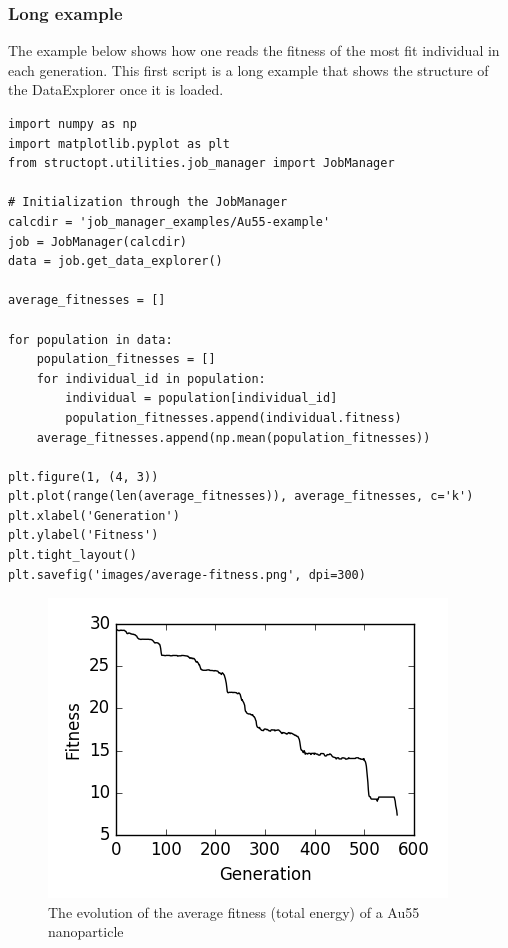 \documentclass[11pt]{article}
\begin{document}
\subsubsection{Long example}
\label{sec:orgheadline3}
The example below shows how one reads the fitness of the most fit individual in each generation. This first script is a long example that shows the structure of the DataExplorer once it is loaded. 

\begin{verbatim}
import numpy as np
import matplotlib.pyplot as plt
from structopt.utilities.job_manager import JobManager

# Initialization through the JobManager
calcdir = 'job_manager_examples/Au55-example'
job = JobManager(calcdir)
data = job.get_data_explorer()

average_fitnesses = []

for population in data:
    population_fitnesses = []
    for individual_id in population:
        individual = population[individual_id]
        population_fitnesses.append(individual.fitness)
    average_fitnesses.append(np.mean(population_fitnesses))

plt.figure(1, (4, 3))
plt.plot(range(len(average_fitnesses)), average_fitnesses, c='k')
plt.xlabel('Generation')
plt.ylabel('Fitness')
plt.tight_layout()
plt.savefig('images/average-fitness.png', dpi=300)
\end{verbatim}

\begin{figure}[htb]
\centering
\includegraphics[width=.9\linewidth]{./images/average-fitness.png}
\caption{The evolution of the average fitness (total energy) of a Au55 nanoparticle}
\end{figure}
\end{document}
